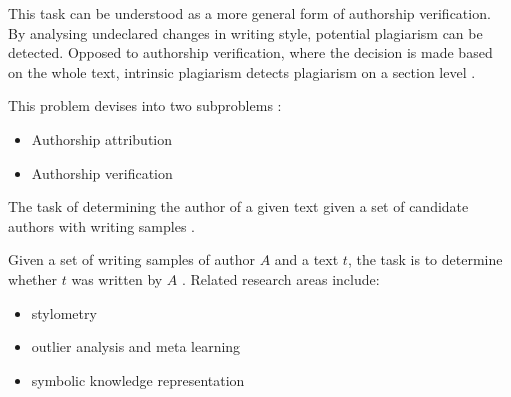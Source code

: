 \begin{definition}
    This task can be understood as a more general form of authorship verification.
    By analysing undeclared changes in writing style, potential plagiarism can be detected.
    Opposed to authorship verification, where the decision is made based on the whole text, intrinsic plagiarism detects plagiarism on a section level \cite{stein_intrinsic_2011}.
\end{definition}

\begin{definition}
    This problem devises into two subproblems \cite{stein_intrinsic_2011}:
    \begin{itemize}
        \item Authorship attribution
        \item Authorship verification
    \end{itemize}
\end{definition}

\begin{definition}
    The task of determining the author of a given text given a set of candidate authors with writing samples \cite{stein_intrinsic_2011}.
\end{definition}

\begin{definition}
    Given a set of writing samples of author $A$ and a text $t$, the task is to determine whether $t$ was written by $A$ \cite{stein_intrinsic_2011}.
    Related research areas include:
    \begin{itemize}
        \item stylometry
        \item outlier analysis and meta learning
        \item symbolic knowledge representation 
    \end{itemize}
\end{definition}

